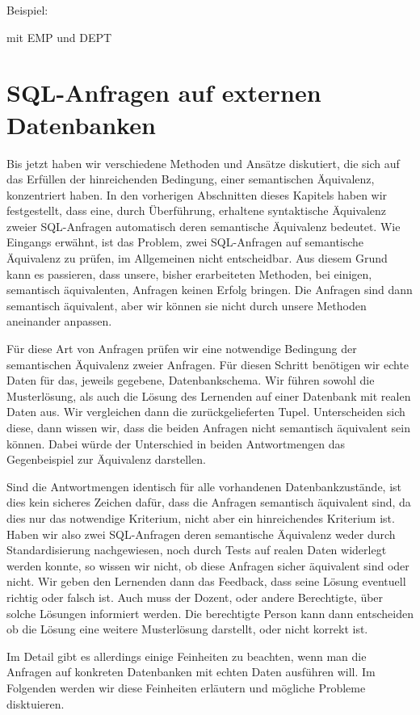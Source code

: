Beispiel:

mit EMP und DEPT

\section{SQL-Anfragen auf externen Datenbanken}

Bis jetzt haben wir verschiedene Methoden und Ansätze diskutiert, die sich auf das Erfüllen der hinreichenden Bedingung, einer semantischen Äquivalenz, konzentriert haben. In den vorherigen Abschnitten dieses Kapitels haben wir festgestellt, dass eine, durch Überführung, erhaltene syntaktische Äquivalenz zweier SQL-Anfragen automatisch deren semantische Äquivalenz bedeutet. Wie Eingangs erwähnt, ist das Problem, zwei SQL-Anfragen auf semantische Äquivalenz zu prüfen, im Allgemeinen nicht entscheidbar. Aus diesem Grund kann es passieren, dass unsere, bisher erarbeiteten Methoden, bei einigen, semantisch äquivalenten, Anfragen keinen Erfolg bringen. Die Anfragen sind dann semantisch äquivalent, aber wir können sie nicht durch unsere Methoden aneinander anpassen. 

Für diese Art von Anfragen prüfen wir eine notwendige Bedingung der semantischen Äquivalenz zweier Anfragen. Für diesen Schritt benötigen wir echte Daten für das, jeweils gegebene, Datenbankschema. Wir führen sowohl die Musterlösung, als auch die Lösung des Lernenden auf einer Datenbank mit realen Daten aus. Wir vergleichen dann die zurückgelieferten Tupel. Unterscheiden sich diese, dann wissen wir, dass die beiden Anfragen nicht semantisch äquivalent sein können. Dabei würde der Unterschied in beiden Antwortmengen das Gegenbeispiel zur Äquivalenz darstellen.

Sind die Antwortmengen identisch für alle vorhandenen Datenbankzustände, ist dies kein sicheres Zeichen dafür, dass die Anfragen semantisch äquivalent sind, da dies nur das notwendige Kriterium, nicht aber ein hinreichendes Kriterium ist. Haben wir also zwei SQL-Anfragen deren semantische Äquivalenz weder durch Standardisierung nachgewiesen, noch durch Tests auf realen Daten widerlegt werden konnte, so wissen wir nicht, ob diese Anfragen sicher äquivalent sind oder nicht. Wir geben den Lernenden dann das Feedback, dass seine Lösung eventuell richtig oder falsch ist. Auch muss der Dozent, oder andere Berechtigte, über solche Lösungen informiert werden. Die berechtigte Person kann dann entscheiden ob die Lösung eine weitere Musterlösung darstellt, oder nicht korrekt ist.

Im Detail gibt es allerdings einige Feinheiten zu beachten, wenn man die Anfragen auf konkreten Datenbanken mit echten Daten ausführen will. Im Folgenden werden wir diese Feinheiten erläutern und mögliche Probleme disktuieren.

